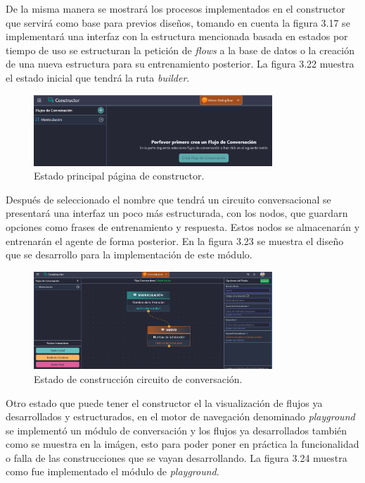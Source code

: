 \documentclass[letter, openright, 12pt]{book}
\begin{document}
De la misma manera se mostrará los procesos implementados en el constructor que servirá como base para previos diseños, tomando en cuenta la figura 3.17 se implementará una interfaz con la estructura mencionada basada en estados por tiempo de uso se estructuran la petición de {\it flows} a la base de datos o la creación de una nueva estructura para su entrenamiento posterior. La figura 3.22 muestra el estado inicial que tendrá la ruta {\it builder}. 

\begin{figure}[H]
\centering
\includegraphics[width=0.8\textwidth]{figura3_22}
 \caption{Estado principal página de constructor. }
\label{fig:figura3_22}
\end{figure}

Después de seleccionado el nombre que tendrá un circuito conversacional se presentará una interfaz un poco más estructurada, con los nodos, que guardarn opciones como frases de entrenamiento y respuesta. Estos nodos se almacenarán y entrenarán el agente de forma posterior. En la figura 3.23 se muestra el diseño que se desarrollo para la implementación de este módulo. 


\begin{figure}[H]
\centering
\includegraphics[width=0.8\textwidth]{figura3_23}
 \caption{Estado de construcción circuito de conversación. }
\label{fig:figura3_23}
\end{figure}

Otro estado que puede tener el constructor el la visualización de flujos ya desarrollados y estructurados, en el motor de navegación denominado {\it playground} se implementó un módulo de conversación y los flujos ya desarrollados también como se muestra en la imágen, esto para poder poner en práctica la funcionalidad o falla de las construcciones que se vayan desarrollando. La figura 3.24 muestra como fue implementado el módulo de {\it playground}.
\end{document}
